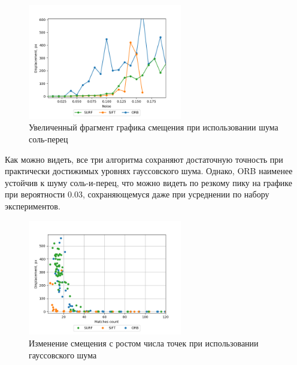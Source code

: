 {{{	\begin{figure}[H]
		\centering                             
		\includegraphics[width=0.60\textwidth,keepaspectratio]{ex2/sp/Rand_noises_displacement_big.png}       
		\centering\caption{ Увеличенный фрагмент графика смещения при использовании шума соль-перец }
		\label{sp disp big}                           
	\end{figure}    
	
	Как можно видеть, все три алгоритма сохраняют достаточную точность при практически достижимых уровнях гауссовского шума. Однако, ORB наименее устойчив к шуму соль-и-перец, что можно видеть по резкому пику на графике при вероятности 0.03, сохраняющемуся даже при усреднении по набору экспериментов.
	
	\begin{figure}[H]
		\centering                             
		\includegraphics[width=0.6\textwidth,keepaspectratio]{ex2/gauss/Rand_noises_d_by_m.png}      
		\centering\caption{ Изменение смещения с ростом числа точек при использовании гауссовского шума}
		\label{rand_noises_gauss_b_by_m}                           
	\end{figure} 
	
}}}
